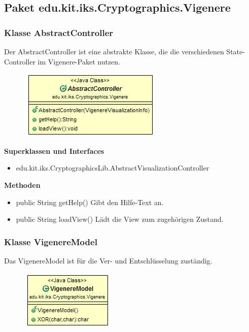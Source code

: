 \documentclass{article}
\begin{document}
  \subsection{Paket edu.kit.iks.Cryptographics.Vigenere}
    \subsubsection{Klasse AbstractController}
      Der AbstractController ist eine abstrakte Klasse, die die verschiedenen State-Controller im Vigenere-Paket nutzen.
      \begin{figure}[H]
        \centering
        \includegraphics{resources/edu-kit-iks-Cryptographics-Vigenere-AbstractController}
      \end{figure}

      \textbf{Superklassen und Interfaces}
      \begin{itemize}
        \item edu.kit.iks.CryptographicsLib.AbstractVisualizationController
      \end{itemize}
      
      \textbf{Methoden}
      \begin{itemize}
        \item public String getHelp() \newline
        Gibt den Hilfe-Text an.
        \item public String loadView() \newline
        Lädt die View zum zugehörigen Zustand.
      \end{itemize}

    \subsubsection{Klasse VigenereModel}
      Das VigenereModel ist für die Ver- und Entschlüsselung zuständig.
      \begin{figure}[H]
        \centering
        \includegraphics{resources/edu-kit-iks-Cryptographics-Vigenere-VigenereModel}
      \end{figure}
      
\end{document}
